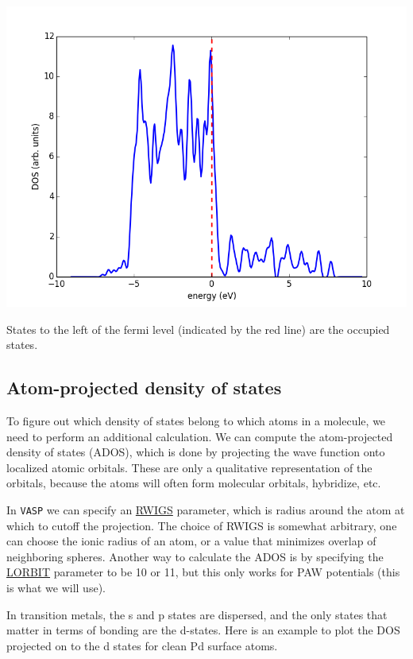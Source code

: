 \documentclass[11pt]{article}
\begin{document}
\includegraphics[width=.9\linewidth]{./images/Pd-bulk-dos.png}

States to the left of the fermi level (indicated by the red line) are the occupied states.


\subsection{Atom-projected density of states}
\label{sec-4-2}

To figure out which density of states belong to which atoms in a molecule, we need to perform an additional calculation. We can compute the atom-projected density of states (ADOS), which is done by projecting the wave function onto localized atomic orbitals. These are only a qualitative representation of the orbitals, because the atoms will often form molecular orbitals, hybridize, etc. 

In \texttt{VASP} we can specify an \href{http://cms.mpi.univie.ac.at/wiki/index.php/RWIGS}{RWIGS} parameter, which is radius around the atom at which to cutoff the projection. The choice of RWIGS is somewhat arbitrary, one can choose the ionic radius of an atom, or a value that minimizes overlap of neighboring spheres. Another way to calculate the ADOS is by specifying the \href{http://cms.mpi.univie.ac.at/vasp/vasp/LORBIT.html}{LORBIT} parameter to be 10 or 11, but this only works for PAW potentials (this is what we will use).

In transition metals, the s and p states are dispersed, and the only states that matter in terms of bonding are the d-states. Here is an example to plot the DOS projected on to the d states for clean Pd surface atoms.
\end{document}

